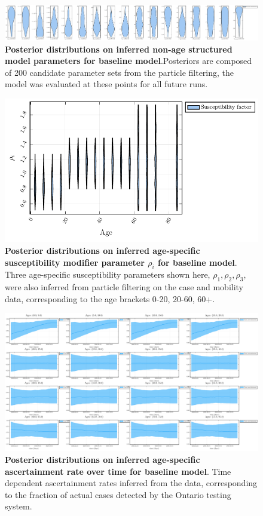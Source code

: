 \label{a1}

\begin{figure}[H]
\centering
\includegraphics[width = 18 cm]{appendices/FigureS1.pdf}
\caption{\textbf{Posterior distributions on inferred non-age structured model parameters for baseline model}.Posteriors are composed of 200 candidate parameter sets from the particle filtering, the model was evaluated at these points for all future runs.}
\label{s1}
\end{figure}

\begin{figure}[H]
    \centering
    \includegraphics[width = 12 cm]{appendices/FigureS2.pdf}
    \caption{\textbf{Posterior distributions on inferred age-specific susceptibility modifier parameter $\rho_i$ for baseline model}. Three age-specific susceptibility parameters shown here, $\rho_1,\rho_2,\rho_3$, were also inferred from particle filtering on the case and mobility data, corresponding to the age brackets 0-20, 20-60, 60+.}
    \label{s2}
    \end{figure}
    
    \clearpage 
    
    \begin{figure}[H]
    \centering
    \includegraphics[width = 18 cm]{appendices/FigureS3.pdf}
    \caption{\textbf{Posterior distributions on inferred age-specific ascertainment rate over time for baseline model}. Time dependent ascertainment rates inferred from the data, corresponding to the fraction of actual cases detected by the Ontario testing system. }
    \label{s3}
    \end{figure}
    
